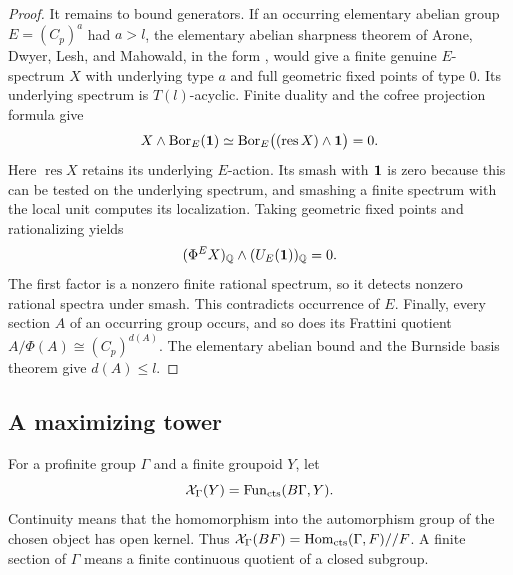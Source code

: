\begin{proof}
It remains to bound generators.  If an occurring elementary abelian
group $E=(C_p)^a$ had $a>l$, the elementary abelian sharpness theorem
of Arone, Dwyer, Lesh, and Mahowald, in the form
\cite[Theorems~2.2 and~4.1]{BHNNNS}, would give a finite genuine $E$-spectrum $X$
with underlying type $a$ and full geometric fixed points of type $0$.
Its underlying spectrum is $T(l)$-acyclic.  Finite duality and the
cofree projection formula give
\[
 X\wedge\operatorname{Bor}_E(\mathbf1)
   \simeq\operatorname{Bor}_E\bigl((\operatorname{res}X)\wedge\mathbf1\bigr)=0.
\]
Here $\operatorname{res}X$ retains its underlying $E$-action.  Its smash
with $\mathbf1$ is zero because this can be tested on the underlying
spectrum, and smashing a finite spectrum with the local unit computes
its localization.  Taking geometric fixed points and
rationalizing yields
\[
 (\Phi^E X)_{\mathbb Q}\wedge(U_E(\mathbf1))_{\mathbb Q}=0.
\]
The first factor is a nonzero finite rational spectrum, so it detects
nonzero rational spectra under smash.  This contradicts occurrence of
$E$.  Finally, every section $A$ of an occurring group occurs, and so
does its Frattini quotient $A/\Phi(A)\cong(C_p)^{d(A)}$.  The elementary
abelian bound and the Burnside basis theorem give $d(A)\le l$.
\end{proof}

\subsection{A maximizing tower}

For a profinite group $\Gamma$ and a finite groupoid $Y$, let
\[
 \mathcal X_\Gamma(Y)=\operatorname{Fun}_{\mathrm{cts}}(B\Gamma,Y).
\]
Continuity means that the homomorphism into the automorphism group of
the chosen object has open kernel.  Thus
$\mathcal X_\Gamma(BF)=\operatorname{Hom}_{\mathrm{cts}}(\Gamma,F)//F$.
A finite section of $\Gamma$ means a finite continuous quotient of a
closed subgroup.

